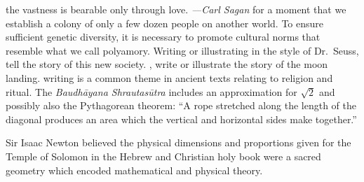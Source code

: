 \newpage%
\bversenonum {} the vastness is bearable only through love. \textit{---Carl Sagan}
\newpage
\bversenonum {} for a moment that we establish a colony of only a few dozen people on another world. To ensure sufficient genetic diversity, it is necessary to promote cultural norms that resemble what we call polyamory. Writing or illustrating in the style of Dr.~Seuss, tell the story of this new society.
\newpage%
\bversenonum {}, write or illustrate the story of the moon landing.
\newpage%
\bversenonum {} writing is a common theme in ancient texts relating to religion and ritual. The \textit{Baudh\=ayana Shrautas\=utra} includes an approximation for $\sqrt{2}$ and possibly also the Pythagorean theorem: ``A rope stretched along the length of the diagonal produces an area which the vertical and horizontal sides make together.''

\bverse Sir Isaac Newton believed the physical dimensions and proportions given for the Temple of Solomon in the Hebrew and Christian holy book were a sacred geometry which encoded mathematical and physical theory.

